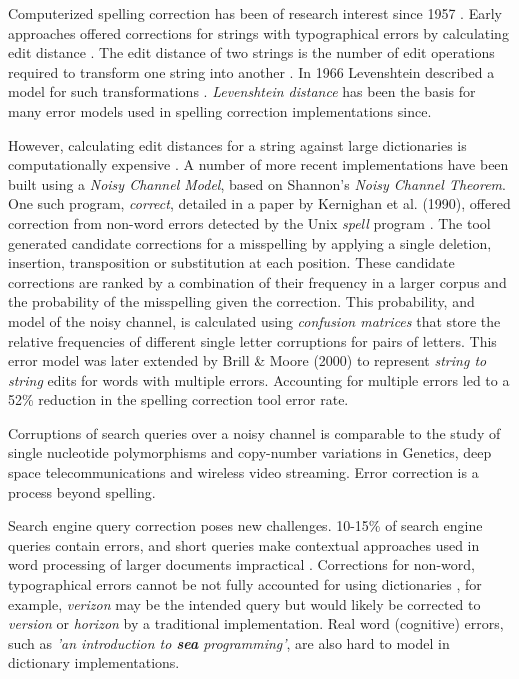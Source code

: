 \documentclass{csfourzero}
\begin{document}
Computerized spelling correction has been of research interest since 1957 \cite{jameslpeterson1980beginning}. Early approaches offered corrections for strings with typographical errors by calculating edit distance \cite{1992correctiondiscussion}. The edit distance of two strings is the number of edit operations required to transform one string into another \cite{introIR}. In 1966 Levenshtein described a model for such transformations \cite{levenshtein1966binary}. \textit{Levenshtein distance} has been the basis for many error models used in spelling correction implementations since.

However, calculating edit distances for a string against large dictionaries is computationally expensive \cite{2009adaptivespellchecker}. A number of more recent implementations have been built using a \textit{Noisy Channel Model}, based on Shannon's \textit{Noisy Channel Theorem}. One such program, \textit{correct}, detailed in a paper by Kernighan et al. (1990), offered correction from non-word errors detected by the Unix \textit{spell} program \cite{originalnoisychannel}. The tool generated candidate corrections for a misspelling by applying a single deletion, insertion, transposition or substitution at each position. These candidate corrections are ranked by a combination of their frequency in a larger corpus and the probability of the misspelling given the correction. This probability, and model of the noisy channel, is calculated using \textit{confusion matrices} that store the relative frequencies of different single letter corruptions for pairs of letters. This error model was later extended by Brill \& Moore (2000) \cite{betternoisychannel} to represent \textit{string to string} edits for words with multiple errors. Accounting for multiple errors led to a 52\% reduction in the spelling correction tool error rate.

Corruptions of search queries over a noisy channel is comparable to the study of single nucleotide polymorphisms and copy-number variations in Genetics, deep space telecommunications and wireless video streaming. Error correction is a process beyond spelling.

Search engine query correction poses new challenges. 10-15\% of search engine queries contain errors, and short queries make contextual approaches used in word processing of larger documents impractical \cite{webuserpoweredspelling}. Corrections for non-word, typographical errors cannot be not fully accounted for using dictionaries \cite{webuser3}, for example, \textit{verizon} may be the intended query but would likely be corrected to \textit{version} or \textit{horizon} by a traditional implementation. Real word (cognitive) errors, such as \textit{'an introduction to \textbf{sea} programming'}, are also hard to model in dictionary implementations.
\end{document}
